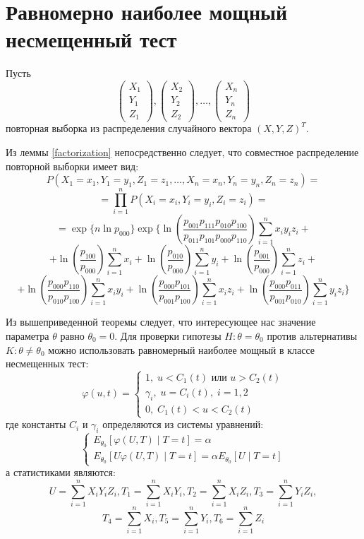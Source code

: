 \section{Равномерно наиболее мощный несмещенный тест}
Пусть
$$
    \begin{pmatrix}
        X_1 \\
        Y_1 \\
        Z_1
    \end{pmatrix},
    \begin{pmatrix}
        X_2 \\
        Y_2 \\
        Z_2
    \end{pmatrix}, \ldots,
    \begin{pmatrix}
        X_n \\
        Y_n \\
        Z_n
    \end{pmatrix}
$$ повторная выборка из распределения случайного вектора $(X,Y,Z)^T$.

Из леммы \ref{factorization} непосредственно следует, что совместное распределение повторной выборки имеет вид:
$$
P(X_1=x_1,Y_1=y_1,Z_1=z_1,\ldots,X_n=x_n,Y_n=y_n,Z_n=z_n)=
$$
$$
=\prod_{i=1}^n P(X_i=x_i,Y_i=y_i,Z_i=z_i) = 
$$
$$=\exp \Biggl\{ n \ln p_{000}\Biggr\}
        \exp \Biggl\{ \ln  \left(\dfrac{p_{001}p_{111}p_{010}p_{100}}{p_{011}p_{101}p_{000}p_{110}}\right) \sum_{i=1}^n x_i y_i z_i +$$
    $$ +
        \ln\left(\dfrac{p_{100}}{p_{000}}\right) \sum_{i=1}^{n} x_i + \ln\left(\dfrac{p_{010}}{p_{000}}\right) \sum_{i=1}^{n} y_i +
        \ln\left(\dfrac{p_{001}}{p_{000}}\right) \sum_{i=1}^{n} z_i +
    $$
    $$
        +\ln \left(\dfrac{p_{000}p_{110}}{p_{010}p_{100}}\right) \sum_{i=1}^n x_i y_i +
        \ln \left(\dfrac{p_{000}p_{101}}{p_{001}p_{100}}\right) \sum_{i=1}^n x_i z_i +
        \ln \left(\dfrac{p_{000}p_{011}}{p_{001}p_{010}}\right) \sum_{i=1}^n y_i z_i \Biggr\}
    $$

Из вышеприведенной теоремы следует, что интересующее нас значение параметра $\theta$ равно $\theta_0=0$.
Для проверки гипотезы $H: \theta = \theta_0$ против альтернативы $K: \theta \neq \theta_0$ можно использовать 
равномерный наиболее мощный в классе несмещенных тест:
$$
\varphi(u,t)=\begin{cases}
    1, \; u<C_1(t) \text{ или } u>C_2(t)\\
    \gamma_i, \; u=C_i(t), \; i=1,2\\
    0, \; C_1(t)<u<C_2(t)
\end{cases}
$$
где константы $C_i$ и $\gamma_i$ определяются из системы уравнений:
$$
\begin{cases}
    E_{\theta_0}[\varphi(U,T) \mid T=t]=\alpha \\
    E_{\theta_0}[U\varphi(U,T) \mid T=t]=\alpha E_{\theta_0}[U \mid T=t]
\end{cases}
$$
а статистиками являются:
$$
    U = \sum_{i=1}^n X_i Y_i Z_i,
    T_1 = \sum_{i=1}^n X_i Y_i,
    T_2 = \sum_{i=1}^n X_i Z_i,
    T_3 = \sum_{i=1}^n Y_i Z_i,
$$
$$
    T_4 = \sum_{i=1}^n X_i,
    T_5 = \sum_{i=1}^n Y_i,
    T_6 = \sum_{i=1}^n Z_i
$$

